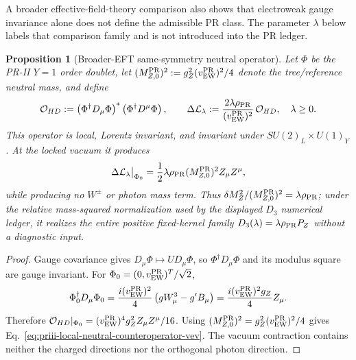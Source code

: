 \documentclass[11pt]{article}
\newtheorem{proposition}[theorem]{Proposition}
\begin{document}
A broader effective-field-theory comparison also shows that electroweak gauge
invariance alone does not define the admissible PR class.  The parameter
\(\lambda\) below labels that comparison family and is not introduced into the
PR ledger.

\begin{proposition}[Broader-EFT same-symmetry neutral operator]
\label{prop:priii-local-neutral-counteroperator}
Let \(\Phi\) be the PR-II \(Y=1\) order doublet, let
\((M_{Z,0}^{\rm PR})^2:=g_Z^2(v_{\rm EW}^{\rm PR})^2/4\) denote the tree/reference neutral
mass, and define
\begin{equation}
\mathcal O_{HD}
:=
\left(\Phi^\dagger D_\mu\Phi\right)^*
\left(\Phi^\dagger D^\mu\Phi\right),
\qquad
\Delta\mathcal L_\lambda
:=
\frac{2\lambda\rho_{\rm PR}}
{(v_{\rm EW}^{\rm PR})^2}\,\mathcal O_{HD},
\quad \lambda\ge0.
\label{eq:priii-local-neutral-counteroperator}
\end{equation}
This operator is local, Lorentz invariant, and invariant under
\(SU(2)_L\times U(1)_Y\).  At the locked vacuum it produces
\begin{equation}
\Delta\mathcal L_\lambda\big|_{\Phi_0}
=
\frac12\lambda\rho_{\rm PR}(M_{Z,0}^{\rm PR})^2 Z_\mu Z^\mu,
\label{eq:priii-local-neutral-counteroperator-vev}
\end{equation}
while producing no \(W^\pm\) or photon mass term.  Thus
\(\delta M_Z^2/(M_{Z,0}^{\rm PR})^2=\lambda\rho_{\rm PR}\); under the relative
mass-squared normalization used by the displayed \(D_3\) numerical ledger, it realizes the entire
positive fixed-kernel family \(D_3(\lambda)=\lambda\rho_{\rm PR}P_Z\) without a diagnostic input.
\end{proposition}

\begin{proof}
Gauge covariance gives \(D_\mu\Phi\mapsto U D_\mu\Phi\), so
\(\Phi^\dagger D_\mu\Phi\) and its modulus square are gauge invariant.  For
\(\Phi_0=(0,v_{\rm EW}^{\rm PR})^T/\sqrt2\),
\begin{equation}
\Phi_0^\dagger D_\mu\Phi_0
=
\frac{i(v_{\rm EW}^{\rm PR})^2}{4}
\left(gW_\mu^3-g'B_\mu\right)
=
\frac{i(v_{\rm EW}^{\rm PR})^2g_Z}{4}Z_\mu .
\end{equation}
Therefore
\(\mathcal O_{HD}|_{\Phi_0}=(v_{\rm EW}^{\rm PR})^4g_Z^2Z_\mu Z^\mu/16\).
Using \((M_{Z,0}^{\rm PR})^2=g_Z^2(v_{\rm EW}^{\rm PR})^2/4\) gives
Eq.~\eqref{eq:priii-local-neutral-counteroperator-vev}.  The vacuum contraction contains neither
the charged directions nor the orthogonal photon direction.
\end{proof}
\end{document}
